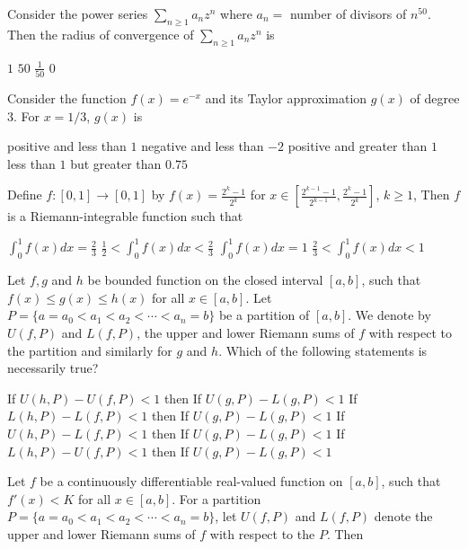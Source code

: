 \documentclass[10pt]{exam}
\begin{document}
\begin{questions}
\question
Consider the power series $\sum_{n \geq 1} a_n z^n$ where $a_n=$ number of divisors of $n^{50}$. Then the radius of convergence of $\sum_{n \geq 1} a_n z^n$ is 

\begin{oneparchoices}
\choice $1$
\choice $50$
\choice $\frac{1}{50}$
\choice $0$
\end{oneparchoices}

\question
Consider the function $f(x)=e^{-x}$ and its Taylor approximation $g(x)$ of degree $3$. For $x=1/3$, $g(x)$ is 

\begin{choices}
\choice positive and less than $1$
\choice negative and less than $-2$
\choice positive and greater than $1$
\choice less than $1$ but greater than $0.75$  
\end{choices}


\question
Define $f:[0,1] \rightarrow [0,1]$ by $f(x)= \frac{2^k-1}{2^k}$ for $x \in \left[\frac{2^{k-1}-1}{2^{k-1}}, \frac{2^k-1}{2^k} \right] $, $k \geq 1$, Then $f$ is a Riemann-integrable function such that


\begin{choices}
\choice $\int_0^1 f(x) dx=\frac{2}{3}$
\choice $\frac{1}{2}<\int_0^1 f(x) dx< \frac{2}{3}$
\choice $\int_0^1 f(x) dx=1$
\choice $\frac{2}{3}<\int_0^1 f(x) dx<1$
\end{choices}

\question
Let $f,g$ and $h$ be bounded function on the closed interval $[a,b]$, such that $f(x) \leq g(x) \leq h(x)$ for all $x\in [a,b]$. Let $P= \{ a=a_0 <a_1 <a_2< \cdots  <a_n=b \}$ be a partition of $[a,b]$. We denote by $U(f,P)$ and $L(f,P)$, the upper and lower Riemann sums of $f$ with respect to the partition and similarly for $g$ and $h$. Which of the following statements is necessarily true?

\begin{choices}
\choice If $U(h,P)-U(f,P)<1$ then If $U(g,P)-L(g,P)<1$
\choice If $L(h,P)-L(f,P)<1$ then If $U(g,P)-L(g,P)<1$
\choice If $U(h,P)-L(f,P)<1$ then If $U(g,P)-L(g,P)<1$
\choice If $L(h,P)-U(f,P)<1$ then If $U(g,P)-L(g,P)<1$
\end{choices}

\question
Let $f$ be a continuously differentiable real-valued function on $[a,b]$, such that $f'(x)<K$ for all $x\in [a,b]$. For a partition $P= \{ a=a_0 <a_1 <a_2< \cdots  <a_n=b \}$, let $U(f,P)$ and $L(f,P)$ denote the upper and lower Riemann sums of $f$ with respect to the $P$. Then


\end{questions}
\end{document}
